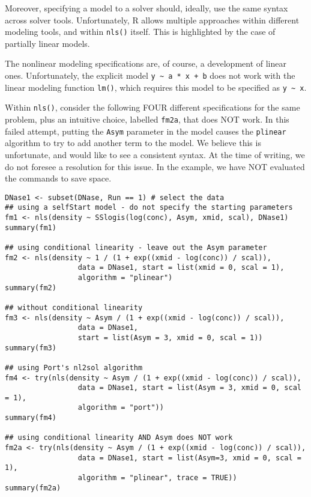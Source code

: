 Moreover, specifying a model to a solver should, ideally, use the same syntax across
solver tools. Unfortunately, R allows multiple approaches within different
modeling tools, and within \texttt{nls()} itself. This is highlighted by the case of
partially linear models.

The nonlinear modeling specifications are, of course, a development of linear ones.
Unfortunately, the explicit model \texttt{y\ \textasciitilde{}\ a\ *\ x\ +\ b} does not work with the linear
modeling function \texttt{lm()}, which requires this model to be specified as \texttt{y\ \textasciitilde{}\ x}.

Within \texttt{nls()}, consider the following FOUR different specifications for the same
problem, plus an intuitive choice, labelled \texttt{fm2a}, that does NOT work. In this
failed attempt, putting the \texttt{Asym} parameter in the model causes the \texttt{plinear}
algorithm to try to add another term to the model. We believe this is
unfortunate, and would like to see a consistent syntax. At the time of writing,
we do not foresee a resolution for this issue. In the example, we have NOT
evaluated the commands to save space.

\begin{verbatim}
DNase1 <- subset(DNase, Run == 1) # select the data
## using a selfStart model - do not specify the starting parameters
fm1 <- nls(density ~ SSlogis(log(conc), Asym, xmid, scal), DNase1)
summary(fm1)

## using conditional linearity - leave out the Asym parameter
fm2 <- nls(density ~ 1 / (1 + exp((xmid - log(conc)) / scal)),
                 data = DNase1, start = list(xmid = 0, scal = 1),
                 algorithm = "plinear")
summary(fm2)

## without conditional linearity
fm3 <- nls(density ~ Asym / (1 + exp((xmid - log(conc)) / scal)),
                 data = DNase1,
                 start = list(Asym = 3, xmid = 0, scal = 1))
summary(fm3)

## using Port's nl2sol algorithm
fm4 <- try(nls(density ~ Asym / (1 + exp((xmid - log(conc)) / scal)),
                 data = DNase1, start = list(Asym = 3, xmid = 0, scal = 1),
                 algorithm = "port"))
summary(fm4)

## using conditional linearity AND Asym does NOT work
fm2a <- try(nls(density ~ Asym / (1 + exp((xmid - log(conc)) / scal)), 
                 data = DNase1, start = list(Asym=3, xmid = 0, scal = 1),
                 algorithm = "plinear", trace = TRUE))
summary(fm2a)
\end{verbatim}

